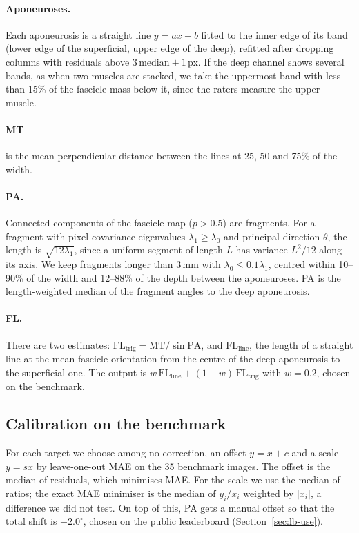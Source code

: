\documentclass[11pt,a4paper]{article}
\newcommand{\PA}{\mathrm{PA}}
\newcommand{\FL}{\mathrm{FL}}
\newcommand{\MT}{\mathrm{MT}}
\begin{document}
\paragraph{Aponeuroses.} Each aponeurosis is a straight line $y=ax+b$ fitted to the inner edge of its band (lower edge of the superficial, upper edge of the deep), refitted after dropping columns with residuals above $3\,\mathrm{median}+1$\,px. If the deep channel shows several bands, as when two muscles are stacked, we take the uppermost band with less than 15\% of the fascicle mass below it, since the raters measure the upper muscle.

\paragraph{MT} is the mean perpendicular distance between the lines at 25, 50 and 75\% of the width.

\paragraph{PA.} Connected components of the fascicle map ($p>0.5$) are fragments. For a fragment with pixel-covariance eigenvalues $\lambda_1\ge\lambda_0$ and principal direction $\theta$, the length is $\sqrt{12\lambda_1}$, since a uniform segment of length $L$ has variance $L^2/12$ along its axis. We keep fragments longer than 3\,mm with $\lambda_0\le0.1\lambda_1$, centred within 10--90\% of the width and 12--88\% of the depth between the aponeuroses. PA is the length-weighted median of the fragment angles to the deep aponeurosis.

\paragraph{FL.} There are two estimates: $\FL_\mathrm{trig}=\MT/\sin\PA$, and $\FL_\mathrm{line}$, the length of a straight line at the mean fascicle orientation from the centre of the deep aponeurosis to the superficial one. The output is $w\,\FL_\mathrm{line}+(1-w)\,\FL_\mathrm{trig}$ with $w=0.2$, chosen on the benchmark.

\subsection{Calibration on the benchmark}

For each target we choose among no correction, an offset $y=x+c$ and a scale $y=sx$ by leave-one-out MAE on the 35 benchmark images. The offset is the median of residuals, which minimises MAE. For the scale we use the median of ratios; the exact MAE minimiser is the median of $y_i/x_i$ weighted by $|x_i|$, a difference we did not test. On top of this, PA gets a manual offset so that the total shift is $+2.0^\circ$, chosen on the public leaderboard (Section~\ref{sec:lb-use}).
\end{document}
